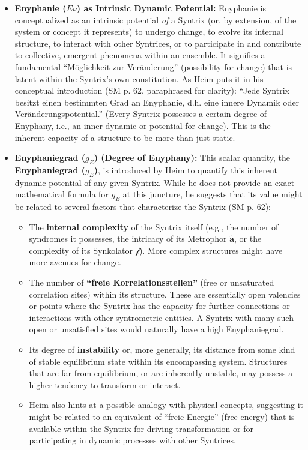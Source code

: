 \documentclass[12pt]{article}
\newcommand{\q}[1]{\enquote{#1}}
\newcommand{\metrophor}{\bm{\widetilde{a}}}
\newcommand{\synkolator}{\mathcal{f}}
\newcommand{\enyphaniegrad}{g_E}
\begin{document}
\begin{itemize}
    \item \textbf{Enyphanie (\(E\nu\)) as Intrinsic Dynamic Potential:} Enyphanie is conceptualized as an intrinsic potential \textit{of} a Syntrix (or, by extension, of the system or concept it represents) to undergo change, to evolve its internal structure, to interact with other Syntrices, or to participate in and contribute to collective, emergent phenomena within an ensemble. It signifies a fundamental \q{Möglichkeit zur Veränderung} (possibility for change) that is latent within the Syntrix's own constitution. As Heim puts it in his conceptual introduction (SM p. 62, paraphrased for clarity): \q{Jede Syntrix besitzt einen bestimmten Grad an Enyphanie, d.h. eine innere Dynamik oder Veränderungspotential.} (Every Syntrix possesses a certain degree of Enyphany, i.e., an inner dynamic or potential for change). This is the inherent capacity of a structure to be more than just static.
    \item \textbf{Enyphaniegrad (\( \enyphaniegrad \)) (Degree of Enyphany):} This scalar quantity, the \textbf{Enyphaniegrad (\(\enyphaniegrad\))}, is introduced by Heim to quantify this inherent dynamic potential of any given Syntrix. While he does not provide an exact mathematical formula for \( \enyphaniegrad \) at this juncture, he suggests that its value might be related to several factors that characterize the Syntrix (SM p. 62):
    \begin{itemize}
        \item The \textbf{internal complexity} of the Syntrix itself (e.g., the number of syndromes it possesses, the intricacy of its Metrophor \( \metrophor \), or the complexity of its Synkolator \( \synkolator \)). More complex structures might have more avenues for change.
        \item The number of \textbf{\q{freie Korrelationsstellen}} (free or unsaturated correlation sites) within its structure. These are essentially open valencies or points where the Syntrix has the capacity for further connections or interactions with other syntrometric entities. A Syntrix with many such open or unsatisfied sites would naturally have a high Enyphaniegrad.
        \item Its degree of \textbf{instability} or, more generally, its distance from some kind of stable equilibrium state within its encompassing system. Structures that are far from equilibrium, or are inherently unstable, may possess a higher tendency to transform or interact.
        \item Heim also hints at a possible analogy with physical concepts, suggesting it might be related to an equivalent of \q{freie Energie} (free energy) that is available within the Syntrix for driving transformation or for participating in dynamic processes with other Syntrices.

\end{itemize}
\end{itemize}
\end{document}
